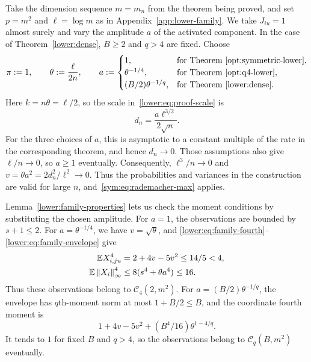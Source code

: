 \documentclass[11pt,letterpaper]{article}
\newenvironment{recovered}{\color{magenta}}{}
\theoremstyle{remark}
\newcommand{\E}{\mathbb E}
\newcommand{\norm}[1]{\left\lVert#1\right\rVert}
\begin{document}
Take the dimension sequence \(m=m_n\) from the theorem being
proved, and set \(p=m^2\) and \(\ell=\log m\) as in
Appendix~\ref{app:lower-family}. We take \(J_{iu}=1\) almost surely
and vary the amplitude \(a\) of the activated component. In the case
of Theorem~\ref{lower:dense}, \(B\ge2\) and \(q>4\) are fixed.
Choose
\[
 \pi:=1,\qquad \theta:=\frac{\ell}{2n},\qquad
 a:=\begin{cases}
 1,&\text{for Theorem~\ref{opt:symmetric-lower}},\\
 \theta^{-1/4},&\text{for Theorem~\ref{opt:q4-lower}},\\
 (B/2)\theta^{-1/q},&\text{for Theorem~\ref{lower:dense}}.
 \end{cases}
\]
Here \(k=n\theta=\ell/2\), so
the scale in~\eqref{lower:eq:proof-scale} is
\[
 d_n=\frac{a\ell^{3/2}}{2\sqrt n}.
\]
For the three choices of \(a\), this is asymptotic to a constant multiple of the
rate in the corresponding theorem, and hence \(d_n\to0\).
Those assumptions also give \(\ell/n\to0\), so \(a\ge1\)
eventually. Consequently, \(\ell^3/n\to0\) and
\(v=\theta a^2=2d_n^2/\ell^2\to0\).
Thus the probabilities and variances in the construction are valid
for large \(n\), and~\eqref{sym:eq:rademacher-max} applies.

\begin{recovered}
Lemma~\ref{lower:family-properties} lets us check the moment
conditions by substituting the chosen amplitude.
\end{recovered}
For \(a=1\), the observations are bounded by \(s+1\le2\).
For \(a=\theta^{-1/4}\), we have \(v=\sqrt\theta\), and
\eqref{lower:eq:family-fourth}--\eqref{lower:eq:family-envelope} give
\begin{align}
 \E X_{i,ju}^4&=2+4v-5v^2\le14/5<4,\notag\\
 \E\norm{X_i}_\infty^4
 &\le8(s^4+\theta a^4)\le16.
 \label{sym:eq:q4-moments}
\end{align}
Thus these observations belong to \(\mathcal C_4(2,m^2)\).
For \(a=(B/2)\theta^{-1/q}\), the envelope has \(q\)th-moment
norm at most \(1+B/2\le B\), and the coordinate fourth moment is
\[
 1+4v-5v^2+(B^4/16)\theta^{1-4/q}.
\]
It tends to \(1\) for fixed \(B\) and \(q>4\), so the observations
belong to \(\mathcal C_q(B,m^2)\) eventually.
\end{document}
